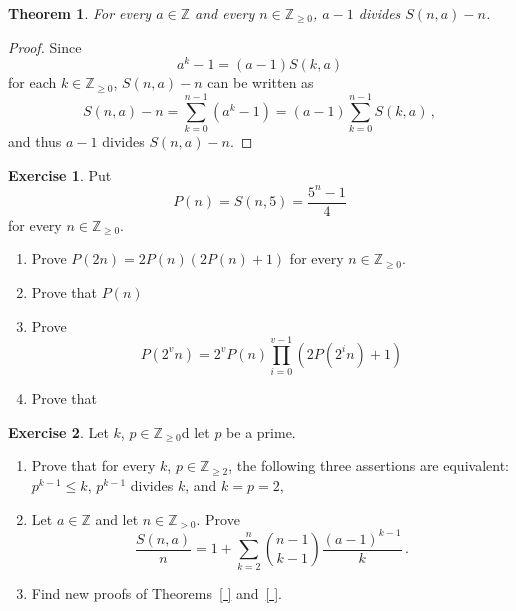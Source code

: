 \documentclass[12pt]{article}
\newcommand{\bZ}{\mathbb{Z}}
\newcommand{\bN}{\bZ_{\ge 0}}%
\newcommand{\bNast}{ \bZ_{> 0}} %
\newtheorem{theorem}{Theorem}
\theoremstyle{definition}
\newtheorem{exercise}{Exercise}
\begin{document}
\begin{theorem} \label{thm:a-1-divides-Sna-n}
  For every $a \in \bZ$ and every $n \in \bN$,
  $a - 1$ divides $S(n, a) - n$.
 \end{theorem}

\begin{proof}
  Since %
  $$
  a^k - 1 = (a - 1) S(k, a)
  $$
  for each $k \in \bN$,
  $S(n, a) - n$ can be written as
  $$
  S(n, a) - n = \sum_{k = 0}^{n - 1} (a^k - 1) = (a - 1) \sum_{k = 0}^{n - 1} S(k, a)  \, ,
  $$
  and thus  $a - 1$ divides $S(n, a) - n$.
\end{proof} 


\begin{exercise}
Put
$$
P(n) = S(n, 5) = \frac{5^n - 1}{4}
$$
for every $n \in \bN$.
\begin{enumerate}
  \item Prove $P(2n) = 2 P(n) (2 P(n) + 1)$ for every $n \in \bN$.
  \item Prove that $P(n)$ 
  \item Prove
  $$
  P(2^v n ) = 2^v P(n) \prod_{i = 0}^{v - 1}  (2 P(2^i n) + 1)  
  $$
  \item Prove that 
  \end{enumerate}
\end{exercise} 

\begin{exercise}
  Let $k$, $p \in \bN$d let $p$ be a prime.
  \begin{enumerate}
  \item Prove that for every $k$, $p \in \bZ_{\ge 2}$, the following three assertions are equivalent:
    $p^{k - 1} \le k$, $p^{k - 1}$ divides $k$, and $k = p = 2$, 
  \item Let $a \in \bZ$ and let $n \in \bNast$.
    Prove 
   $$
  \frac{S(n, a)}{n}  = 1 + \sum_{k = 2}^n \binom{n - 1}{k - 1} \frac{{(a - 1)}^{k - 1}}{k}  \, . 
  $$
 \item Find new proofs of Theorems~\ref{ } and~\ref{ }.
  \end{enumerate}
\end{exercise} 
%
\end{document}
